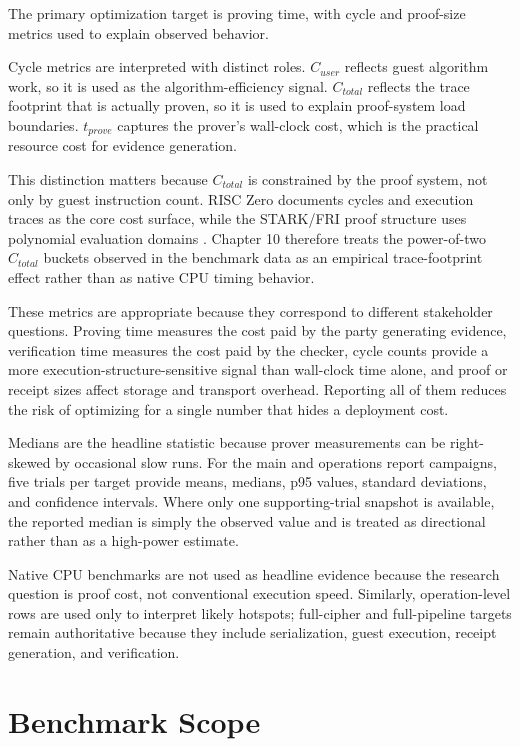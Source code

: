 The primary optimization target is proving time, with cycle and proof-size
metrics used to explain observed behavior.

Cycle metrics are interpreted with distinct roles. \(C_{user}\) reflects guest
algorithm work, so it is used as the algorithm-efficiency signal. \(C_{total}\)
reflects the trace footprint that is actually proven, so it is used to explain
proof-system load boundaries. \(t_{prove}\) captures the prover's wall-clock
cost, which is the practical resource cost for evidence generation.

This distinction matters because \(C_{total}\) is constrained by the proof
system, not only by guest instruction count. RISC Zero documents cycles and
execution traces as the core cost surface, while the STARK/FRI proof structure
uses polynomial evaluation domains \cite{risczeroTraceDocs,bensasson2018stark}.
Chapter 10 therefore treats the power-of-two \(C_{total}\) buckets observed in
the benchmark data as an empirical trace-footprint effect rather than as native
CPU timing behavior.

These metrics are appropriate because they correspond to different stakeholder
questions. Proving time measures the cost paid by the party generating evidence,
verification time measures the cost paid by the checker, cycle counts provide a
more execution-structure-sensitive signal than wall-clock time alone, and proof
or receipt sizes affect storage and transport overhead. Reporting all of them
reduces the risk of optimizing for a single number that hides a deployment cost.

Medians are the headline statistic because prover measurements can be
right-skewed by occasional slow runs. For the main and operations report
campaigns, five trials per target provide means, medians, p95 values, standard
deviations, and confidence intervals. Where only one supporting-trial snapshot is
available, the reported median is simply the observed value and is treated as
directional rather than as a high-power estimate.

Native CPU benchmarks are not used as headline evidence because the research
question is proof cost, not conventional execution speed. Similarly,
operation-level rows are used only to interpret likely hotspots; full-cipher and
full-pipeline targets remain authoritative because they include serialization,
guest execution, receipt generation, and verification.

\section{Benchmark Scope}

